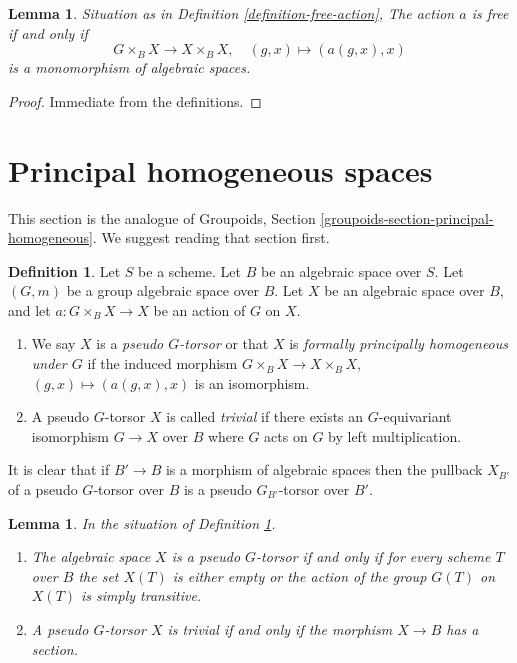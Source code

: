 \documentclass{stacks-project}
\theoremstyle{plain}
\newtheorem{lemma}[subsection]{Lemma}
\theoremstyle{definition}
\newtheorem{definition}[subsection]{Definition}
\theoremstyle{remark}
\numberwithin{equation}{subsection}
\begin{document}
\begin{lemma}
\label{lemma-free-action}
Situation as in
Definition \ref{definition-free-action},
The action $a$ is free if and only if
$$
G \times_B X \to X \times_B X, \quad (g, x) \mapsto (a(g, x), x)
$$
is a monomorphism of algebraic spaces.
\end{lemma}

\begin{proof}
Immediate from the definitions.
\end{proof}









\section{Principal homogeneous spaces}
\label{section-principal-homogeneous}

\noindent
This section is the analogue of
Groupoids, Section \ref{groupoids-section-principal-homogeneous}.
We suggest reading that section first.

\begin{definition}
\label{definition-pseudo-torsor}
Let $S$ be a scheme. Let $B$ be an algebraic space over $S$.
Let $(G, m)$ be a group algebraic space over $B$.
Let $X$ be an algebraic space over $B$, and let
$a : G \times_B X \to X$ be an action of $G$ on $X$.
\begin{enumerate}
\item We say $X$ is a {\it pseudo $G$-torsor} or that $X$ is
{\it formally principally homogeneous under $G$} if the induced
morphism $G \times_B X \to X \times_B X$,
$(g, x) \mapsto (a(g, x), x)$ is an isomorphism.
\item A pseudo $G$-torsor $X$ is called {\it trivial} if there exists
an $G$-equivariant isomorphism $G \to X$ over $B$ where $G$ acts on
$G$ by left multiplication.
\end{enumerate}
\end{definition}

\noindent
It is clear that if $B' \to B$ is a morphism of algebraic spaces then
the pullback $X_{B'}$ of a pseudo $G$-torsor over $B$ is a
pseudo $G_{B'}$-torsor over $B'$.

\begin{lemma}
\label{lemma-characterize-trivial-pseudo-torsors}
In the situation of
Definition \ref{definition-pseudo-torsor}.
\begin{enumerate}
\item The algebraic space $X$ is a pseudo $G$-torsor if and only if for
every scheme $T$ over $B$ the set $X(T)$ is either empty or the action
of the group $G(T)$ on $X(T)$ is simply transitive.
\item A pseudo $G$-torsor $X$ is trivial if and only if the morphism
$X \to B$ has a section.
\end{enumerate}
\end{lemma}
\end{document}
